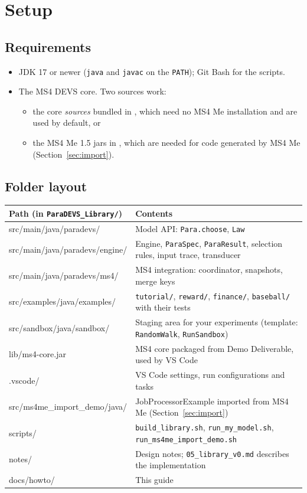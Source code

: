 \documentclass[11pt]{article}
\newcommand{\code}[1]{\texttt{#1}}
\begin{document}
\section{Setup}

\subsection{Requirements}
\begin{itemize}
\item JDK 17 or newer (\code{java} and \code{javac} on the \code{PATH}); Git Bash for the scripts.
\item The MS4 DEVS core. Two sources work:
  \begin{itemize}
  \item the core \emph{sources} bundled in , which need no MS4 Me
    installation and are used by default, or
  \item the MS4 Me 1.5 jars in , which are needed for code generated by
    MS4 Me (Section~\ref{sec:import}).
  \end{itemize}
\end{itemize}

\subsection{Folder layout}
\begin{center}
\begin{tabularx}{\linewidth}{@{}>{\ttfamily\small}l Y@{}}
\toprule
\normalfont\textbf{Path (in \texttt{ParaDEVS\_Library/})} & \textbf{Contents}\\
\midrule
src/main/java/paradevs/ & Model API: \code{Para.choose}, \code{Law}\\
src/main/java/paradevs/engine/ & Engine, \code{ParaSpec}, \code{ParaResult}, selection rules, input trace, transducer\\
src/main/java/paradevs/ms4/ & MS4 integration: coordinator, snapshots, merge keys\\
src/examples/java/examples/ & \code{tutorial/}, \code{reward/}, \code{finance/}, \code{baseball/} with their tests\\
src/sandbox/java/sandbox/ & Staging area for your experiments (template: \code{RandomWalk}, \code{RunSandbox})\\
lib/ms4-core.jar & MS4 core packaged from Demo Deliverable, used by VS Code\\
.vscode/ & VS Code settings, run configurations and tasks\\
src/ms4me\_import\_demo/java/ & JobProcessorExample imported from MS4 Me (Section~\ref{sec:import})\\
scripts/ & \code{build\_library.sh}, \code{run\_my\_model.sh}, \code{run\_ms4me\_import\_demo.sh}\\
notes/ & Design notes; \code{05\_library\_v0.md} describes the implementation\\
docs/howto/ & This guide\\
\bottomrule
\end{tabularx}
\end{center}
\end{document}
